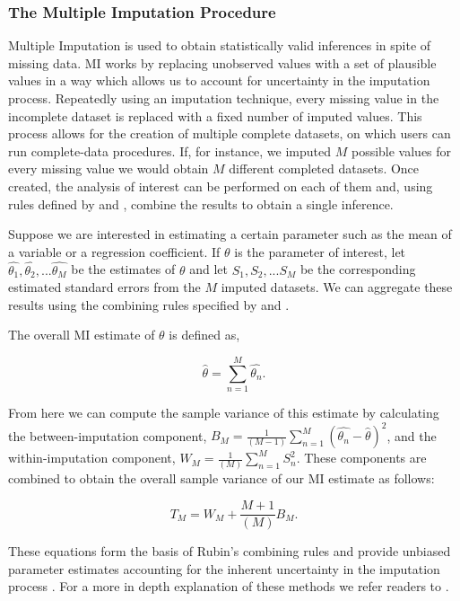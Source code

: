 \documentclass{svjour3}\usepackage[]{graphicx}\usepackage[]{color}
\begin{document}
\subsubsection{The Multiple Imputation Procedure}
\label{sec:1.3.2}
Multiple Imputation is used to obtain statistically valid inferences in spite of missing data. MI works by replacing unobserved values with a set of plausible values in a way which allows us to account for uncertainty in the imputation process. Repeatedly using an imputation technique, every missing value in the incomplete dataset is replaced with a fixed number of imputed values. This process allows for the creation of multiple complete datasets, on which users can run complete-data procedures. If, for instance, we imputed $M$ possible values for every missing value we would obtain $M$ different completed datasets. Once created, the analysis of interest can be performed on each of them and, using rules defined by \citet{little2014statistical} and \citet{rubin2004multiple}, combine the results to obtain a single inference. \par

Suppose we are interested in estimating a certain parameter such as the mean of a variable or a regression coefficient. If $\theta$ is the parameter of interest, let $\widehat{\theta_1}, \widehat{\theta_2}, ... \widehat{\theta_M}$ be the estimates of $\theta$ and let $S_1, S_2, ... S_M$ be the corresponding estimated standard errors from the $M$ imputed datasets. We can aggregate these results using the combining rules specified by \citet{little2014statistical} and \citet{rubin2004multiple}. \par
The overall MI estimate of $\theta$ is defined as,

\begin{equation}
\widehat{\theta} = \sum_{n=1}^{M} \widehat{\theta_n}.
\end{equation}

From here we can compute the sample variance of this estimate by calculating the between-imputation component, $B_M = \frac{1}{(M-1)}\sum_{n=1}^{M} (\widehat{\theta_n} - \widehat{\theta})^2$, and the within-imputation component, $W_M = \frac{1}{(M)}\sum_{n=1}^{M} S_n^2$. These components are combined to obtain the overall sample variance of our MI estimate as follows:

\begin{equation}
T_M = W_M + \frac{M+1}{(M)}B_M.
\end{equation}

These equations form the basis of Rubin's combining rules and provide unbiased parameter estimates accounting for the inherent uncertainty in the imputation process \citep{raghunathan2015missing}. For a more in depth explanation of these methods we refer readers to \citet{little2014statistical}. \par
\end{document}
